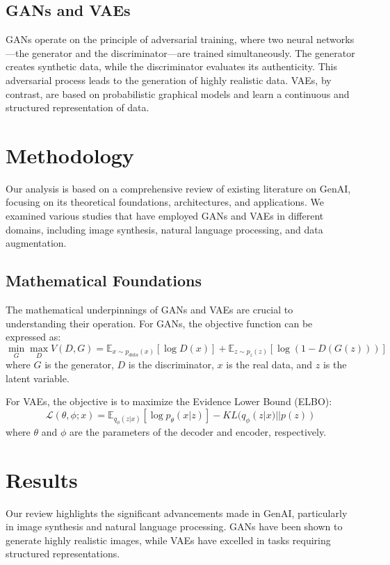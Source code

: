 \documentclass[12pt,a4paper]{article}
\begin{document}
\subsection{GANs and VAEs}
GANs operate on the principle of adversarial training, where two neural networks—the generator and the discriminator—are trained simultaneously. The generator creates synthetic data, while the discriminator evaluates its authenticity. This adversarial process leads to the generation of highly realistic data. VAEs, by contrast, are based on probabilistic graphical models and learn a continuous and structured representation of data.

\section{Methodology}
Our analysis is based on a comprehensive review of existing literature on GenAI, focusing on its theoretical foundations, architectures, and applications. We examined various studies that have employed GANs and VAEs in different domains, including image synthesis, natural language processing, and data augmentation.

\subsection{Mathematical Foundations}
The mathematical underpinnings of GANs and VAEs are crucial to understanding their operation. For GANs, the objective function can be expressed as:
\[
\min_G \max_D V(D, G) = \mathbb{E}_{x \sim p_{data}(x)} [\log D(x)] + \mathbb{E}_{z \sim p_z(z)} [\log (1 - D(G(z)))]
\]
where $G$ is the generator, $D$ is the discriminator, $x$ is the real data, and $z$ is the latent variable.

For VAEs, the objective is to maximize the Evidence Lower Bound (ELBO):
\[
\mathcal{L}(\theta, \phi; x) = \mathbb{E}_{q_\phi(z|x)} [\log p_\theta(x|z)] - KL(q_\phi(z|x) || p(z))
\]
where $\theta$ and $\phi$ are the parameters of the decoder and encoder, respectively.

\section{Results}
Our review highlights the significant advancements made in GenAI, particularly in image synthesis and natural language processing. GANs have been shown to generate highly realistic images, while VAEs have excelled in tasks requiring structured representations.
\end{document}
